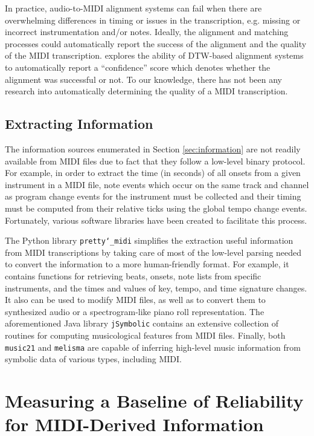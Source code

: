 \documentclass{article}
\begin{document}
In practice, audio-to-MIDI alignment systems can fail when there are overwhelming differences in timing or issues in the transcription, e.g. missing or incorrect instrumentation and/or notes.
Ideally, the alignment and matching processes could automatically report the success of the alignment and the quality of the MIDI transcription.
\cite{raffel2016optimizing} explores the ability of DTW-based alignment systems to automatically report a ``confidence'' score which denotes whether the alignment was successful or not.
To our knowledge, there has not been any research into automatically determining the quality of a MIDI transcription.

\subsection{Extracting Information}

The information sources enumerated in Section \ref{sec:information} are not readily available from MIDI files due to fact that they follow a low-level binary protocol.
For example, in order to extract the time (in seconds) of all onsets from a given instrument in a MIDI file, note events which occur on the same track and channel as program change events for the instrument must be collected and their timing must be computed from their relative ticks using the global tempo change events.
Fortunately, various software libraries have been created to facilitate this process.

The Python library \texttt{pretty\char`_midi} \cite{raffel2014pretty_midi} simplifies the extraction useful information from MIDI transcriptions by taking care of most of the low-level parsing needed to convert the information to a more human-friendly format.
For example, it contains functions for retrieving beats, onsets, note lists from specific instruments, and the times and values of key, tempo, and time signature changes.
It also can be used to modify MIDI files, as well as to convert them to synthesized audio or a spectrogram-like piano roll representation.
The aforementioned Java library \texttt{jSymbolic} contains an extensive collection of routines for computing musicological features from MIDI files.
Finally, both \texttt{music21} and \texttt{melisma} are capable of inferring high-level music information from symbolic data of various types, including MIDI.

\section{Measuring a Baseline of Reliability for MIDI-Derived Information}
\label{sec:measuring}
\end{document}
